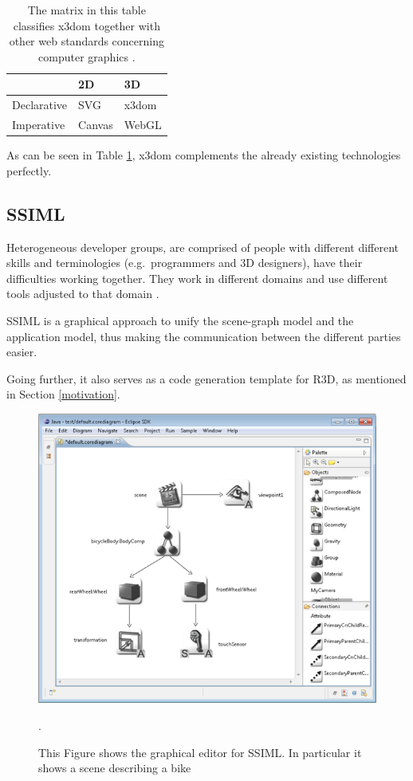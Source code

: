 \begin{longtable}[c]{@{}lll@{}}
  \caption{The matrix in this table classifies x3dom together with other web standards concerning computer graphics \cite{x3dom}.\label{tab:feature_matrix}}\\
  \toprule
  & 2D & \gls{3D} \tabularnewline
  \midrule
  \endhead
  Declarative & \gls{SVG} \cite{svg} & x3dom \cite{x3dom} \tabularnewline
  Imperative  & Canvas \cite{canvas} & \gls{WebGL} \cite{webgl} \tabularnewline
  \bottomrule
\end{longtable}

As can be seen in Table \ref{tab:feature_matrix}, x3dom complements the already existing technologies
perfectly.

\clearpage
\subsection{SSIML}
\label{ssiml}

Heterogeneous developer groups, are comprised of people with
different different skills and terminologies (e.g.~programmers and \gls{3D} designers), have their difficulties
working together. They work in different domains and use different tools
adjusted to that domain \cite{Glinz:2015:SUS:2802768.2802838}.

SSIML is a graphical approach to unify the scene-graph model and the
application model, thus making the communication between the different
parties easier.

Going further, it also serves as a code generation template for \gls{R3D}, as mentioned in Section \ref{motivation}.

\begin{figure}
  \centering
  \includegraphics[width=\textwidth]{../assets/SSIML.png}
	\caption{This Figure shows the graphical editor for SSIML. In particular it shows a scene describing a bike \cite{roundtrip3dwebsite}}.
	\label{fig:ssimldiagram}
\end{figure}


